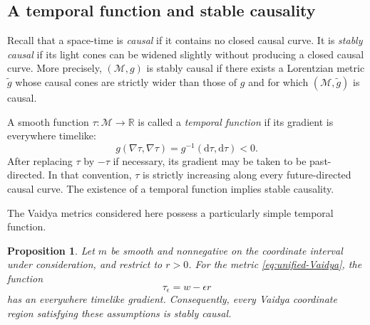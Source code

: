 \documentclass[11pt,a4paper]{article}
\newtheorem{proposition}[theorem]{Proposition}
\theoremstyle{definition}
\theoremstyle{remark}
\newcommand{\M}{\mathcal M}
\newcommand{\dd}{\mathrm d}
\begin{document}
	\subsection{A temporal function and stable causality}
	
	Recall that a space-time is \emph{causal} if it contains no closed causal
	curve.  It is \emph{stably causal} if its light cones can be widened slightly
	without producing a closed causal curve.  More precisely, $(\M,g)$ is stably
	causal if there exists a Lorentzian metric $\widetilde g$ whose causal cones
	are strictly wider than those of $g$ and for which $(\M,\widetilde g)$ is
	causal.
	
	A smooth function $\tau:\M\to\mathbb R$ is called a \emph{temporal function}
	if its gradient is everywhere timelike:
	\[
	g(\nabla\tau,\nabla\tau)
	=
	g^{-1}(\dd\tau,\dd\tau)<0.
	\]
	After replacing $\tau$ by $-\tau$ if necessary, its gradient may be taken to
	be past-directed.  In that convention, $\tau$ is strictly increasing along
	every future-directed causal curve.  The existence of a temporal function
	implies stable causality.
	
	The Vaidya metrics considered here possess a particularly simple temporal
	function.
	
	\begin{proposition}
		Let $m$ be smooth and nonnegative on the coordinate interval under
		consideration, and restrict to $r>0$.  For the metric
		\eqref{eq:unified-Vaidya}, the function
		\begin{equation}
			\tau_\epsilon=w-\epsilon r
			\label{eq:temporal-function}
		\end{equation}
		has an everywhere timelike gradient.  Consequently, every Vaidya coordinate
		region satisfying these assumptions is stably causal.
	\end{proposition}
	
\end{document}
